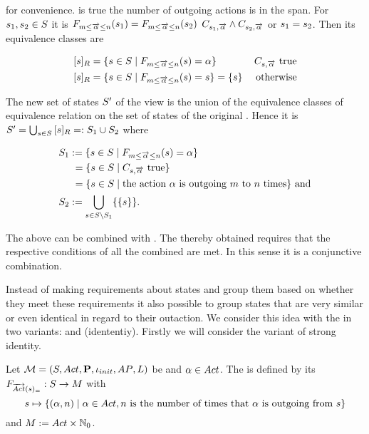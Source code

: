 \documentclass[preview]{standalone}
\begin{document}
for convenience. \formoutact is true  \iffN the number of outgoing actions is in the span. For ${s}_1, {s}_2 \in {S}$ it is ${{F_{{m}\leq{\overrightarrow{\ensuremath{{\alpha}}}}\leq{n}}}}({s}_1) = {{F_{{m}\leq{\overrightarrow{\ensuremath{{\alpha}}}}\leq{n}}}}({s}_2)$ \iffN $\formoutact[\state_1] \land \formoutact[\state_2]$ or ${s}_1 = {s}_2$. Then its equivalence classes are

\begin{align*}
	{\ensuremath{{[{s}]_{{R}}}}} &= \{{s} \in {S} \mid {\ensuremath{{F_{{m}\leq{\overrightarrow{\ensuremath{{\alpha}}}}\leq{n}}}}}({s}) = {\alpha}\} &{C_{{s},{\overrightarrow{{\alpha}}}}} \text{ true} \\
	{{[{s}]_{{R}}}} &= \{{s} \in {S} \mid {\ensuremath{{F_{{m}\leq{\overrightarrow{\ensuremath{{\alpha}}}}\leq{n}}}}}({s}) = {s}\} = \{{s}\} &\text{ otherwise}	
\end{align*}

The new set of states ${S}'$ of the view \viewspanoutaction is the union of the equivalence classes of equivalence relation \eqrelview on the set of states \states of the original \chosengraphtypeN. Hence it is ${S}' = \bigcup_{{s} \in {S}} {{[{s}]_{{R}}}} =: {S}_1 \cup {S}_2$ where

\begin{align*}
	{S}_1 &:= \{{s} \in {S} \mid {\ensuremath{{F_{{m}\leq{\overrightarrow{\ensuremath{{\alpha}}}}\leq{n}}}}}({s}) = {\alpha}\} \\
	&\hspace{1.15mm}= \{{s} \in {S}  \mid {C_{\ensuremath{{s}},\ensuremath{{\overrightarrow{{\alpha}}}}}} \text{ true}\} \\
	&\hspace{1.15mm}= \{{s} \in {S} \mid \text{the action } {\alpha} \text{ is outgoing } {m} \text{ to } {n} \text{ times}\} \text{ and} \\
	{S}_2 &:= {\bigcup_{{s} \in {S} \setminus {S}_1}\{\{{s}\}\}}.
\end{align*}

The \viewsN above can be combined with \parllcompN. The thereby obtained \viewN requires that the respective conditions of all the combined \viewsN are met. In this sense it is a conjunctive combination.

Instead of making requirements about states and group them based on whether they meet these requirements it also possible to group states that are very similar or even identical in regard to their outaction. We consider this idea with the \emph{\outactident \viewNC} in two variants: \outactidentstrong and \outactidentweak (idententiy). Firstly we will consider the variant of strong identity.

\begin{definition}
	Let ${{{\mathcal{M}}}} = {{({S}, {Act}, {\textbf{P}}, {\iota_{init}}, {AP}, {L})}}$ be \chosengraphtypeN and ${\alpha} \in {Act}$. The \viewN \viewstrongoutactident is defined by its \grpfctN ${{F_{{\overrightarrow{{Act}}}({s})_=}}} : {S} \to {\ensuremath{{M}}}$ with
	\[
	\state \mapsto	
	\{(\action, \numoutact) \mid \action \in \actions, \numoutact \text{ is the number of times that \action is outgoing from } \state\}
	\]
	and ${{M}} := {Act} \times {\mathbb{N}}_0$.
\end{definition}
\end{document}

